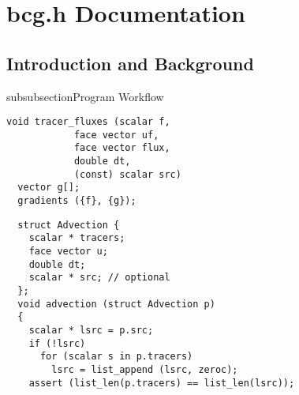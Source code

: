\chapter{bcg.h Documentation}
\chaptermeta[1.0][2025-01-01]
\section{Introduction and Background}\label{sec:intro}

\begin{codesection}{subsubsection}{Program Workflow}

\begin{verbatim}
void tracer_fluxes (scalar f,
		    face vector uf,
		    face vector flux,
		    double dt,
		    (const) scalar src)
  vector g[];
  gradients ({f}, {g});
\end{verbatim}

\codearrow


\begin{verbatim}
  struct Advection {
    scalar * tracers;
    face vector u;
    double dt;
    scalar * src; // optional
  };
  void advection (struct Advection p)
  {
    scalar * lsrc = p.src;
    if (!lsrc)
      for (scalar s in p.tracers)
        lsrc = list_append (lsrc, zeroc);
    assert (list_len(p.tracers) == list_len(lsrc));
\end{verbatim}

\end{codesection}
  